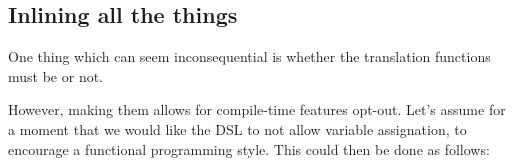 \subsection{Inlining all the things}\label{sec:inline}

One thing which can seem inconsequential is whether the translation functions must be  or not. 

However, making them  allows for compile-time features opt-out. Let's assume for a moment that we would like the \rob{} DSL to not allow variable assignation, to encourage a functional programming style. This could then be done as follows:

